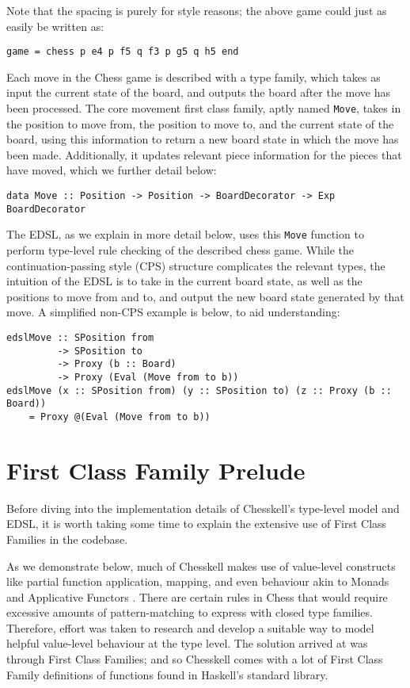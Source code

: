 \documentclass[12pt, a4paper, bibliography=totocnumbered]{scrreprt}
\newcommand{\inline}[1]{\lstinline[basicstyle=\ttfamily\footnotesize]{#1}}
\begin{document}
Note that the spacing is purely for style reasons; the above game could just as easily be written as:

\begin{lstlisting}
game = chess p e4 p f5 q f3 p g5 q h5 end
\end{lstlisting}

Each move in the Chess game is described with a type family, which takes as input the current state of the board, and outputs the board after the move has been processed. The core movement first class family, aptly named \inline{Move}, takes in the position to move from, the position to move to, and the current state of the board, using this information to return a new board state in which the move has been made. Additionally, it updates relevant piece information for the pieces that have moved, which we further detail below:

\begin{lstlisting}
data Move :: Position -> Position -> BoardDecorator -> Exp BoardDecorator
\end{lstlisting}

The EDSL, as we explain in more detail below, uses this \inline{Move} function to perform type-level rule checking of the described chess game. While the continuation-passing style (CPS) structure complicates the relevant types, the intuition of the EDSL is to take in the current board state, as well as the positions to move from and to, and output the new board state generated by that move. A simplified non-CPS example is below, to aid understanding:

\begin{lstlisting}
edslMove :: SPosition from
         -> SPosition to
         -> Proxy (b :: Board)
         -> Proxy (Eval (Move from to b))
edslMove (x :: SPosition from) (y :: SPosition to) (z :: Proxy (b :: Board))
    = Proxy @(Eval (Move from to b))
\end{lstlisting}

\section{First Class Family Prelude}

Before diving into the implementation details of Chesskell's type-level model and EDSL, it is worth taking some time to explain the extensive use of First Class Families in the codebase.

As we demonstrate below, much of Chesskell makes use of value-level constructs like partial function application, mapping, and even behaviour akin to Monads and Applicative Functors \cite{applicatives}. There are certain rules in Chess that would require excessive amounts of pattern-matching to express with closed type families. Therefore, effort was taken to research and develop a suitable way to model helpful value-level behaviour at the type level. The solution arrived at was through First Class Families; and so Chesskell comes with a lot of First Class Family definitions of functions found in Haskell's standard library.
\end{document}
